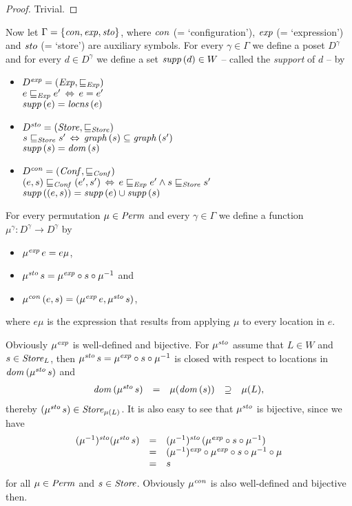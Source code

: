 \documentclass[12pt,a4paper]{report}
\newcommand{\Conf}{\nstyle{Conf}}
\newcommand{\scon}{\nstyle{con}}
\newcommand{\sexp}{\nstyle{exp}}
\newcommand{\ssto}{\nstyle{sto}}
\begin{document}
\begin{proof}
  Trivial.
\end{proof}

Now let $\Gamma = \{\scon,\sexp,\ssto\}$, where $\scon$ (= `configuration'),
$\sexp$ (= `expression') and $\ssto$ (= `store') are auxiliary symbols. For
every $\gamma \in \Gamma$ we define a poset $D^\gamma$ and for every $d \in D^\gamma$
we define a set $\mathit{supp}\,(d) \in W$ -- called the {\em support} of $d$ -- by
\begin{itemize}
  \item $D^\sexp = (\Exp,\sqsubseteq_\Exp)$ \\
        $e \sqsubseteq_{\mathit{Exp}} e' \,\Leftrightarrow\, e = e'$ \\
        $\mathit{supp}\,(e) = \mathit{locns}\,(e)$
  \item $D^\ssto = (\Store,\sqsubseteq_\Store)$ \\
        $s \sqsubseteq_{\mathit{Store}} s' \,\Leftrightarrow\, \mathit{graph}\,(s) \subseteq \mathit{graph}\,(s')$ \\
        $\mathit{supp}\,(s) = \mathit{dom}\,(s)$
  \item $D^\scon = (\Conf,\sqsubseteq_\Conf)$ \\
        $(e,s) \sqsubseteq_\Conf (e',s') \,\Leftrightarrow\, e \sqsubseteq_\Exp e' \wedge s \sqsubseteq_\Store s'$ \\
        $\mathit{supp}\,((e,s)) = \mathit{supp}\,(e) \cup \mathit{supp}\,(s)$
\end{itemize}
For every permutation $\mu \in \mathit{Perm}$ and every $\gamma\in\Gamma$ we define
a function $\mu^\gamma:D^\gamma \to D^\gamma$ by
\begin{itemize}
  \item $\mu^\sexp\,e = e\mu$,
  \item $\mu^\ssto\,s = \mu^\sexp \circ s \circ \mu^{-1}$ and
  \item $\mu^\scon\,(e,s) = (\mu^\sexp\,e,\mu^\ssto\,s)$,
\end{itemize}
where $e\mu$ is the expression that results from applying $\mu$ to every location in $e$.

Obviously $\mu^\sexp$ is well-defined and bijective. For $\mu^\ssto$ assume that $L \in W$ and $s\in\mathit{Store}_L$,
then $\mu^\ssto\,s = \mu^\sexp \circ s \circ \mu^{-1}$ is closed with respect to locations in
$\dom{\mu^\ssto\,s}$ and
\[\begin{array}{rccccl}
  \dom{\mu^\ssto\,s} &=& \mu(\dom{s}) &\supseteq& \mu(L),
\end{array}\]
thereby $(\mu^\ssto\,s) \in \Store_{\mu(L)}$. It is also easy to see that $\mu^\ssto$ is bijective, since
we have
\[\begin{array}{rcl}
  (\mu^{-1})^\ssto(\mu^\ssto\,s)
  &=& (\mu^{-1})^\ssto\,(\mu^\sexp \circ s \circ \mu^{-1}) \\
  &=& (\mu^{-1})^\sexp \circ \mu^\sexp \circ s \circ \mu^{-1} \circ \mu \\
  &=& s
\end{array}\]
for all $\mu\in\mathit{Perm}$ and $s\in\mathit{Store}$. Obviously $\mu^\scon$ is also well-defined and bijective then.
\end{document}
